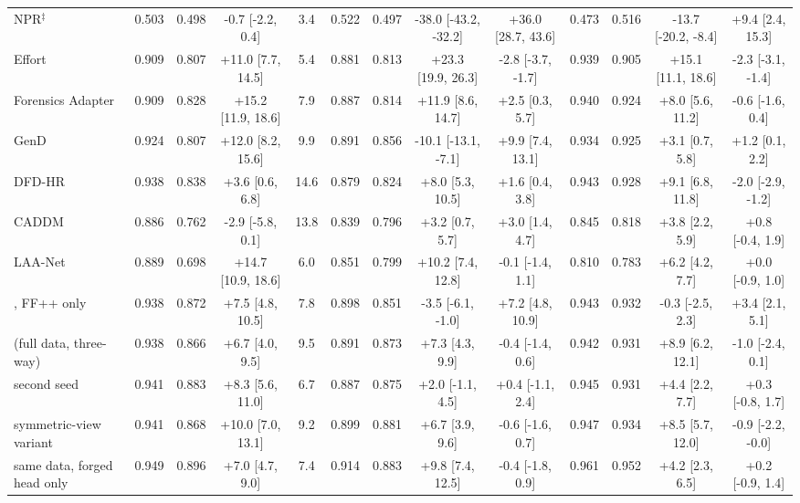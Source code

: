 \begin{tabular}{@{}l cccc cccc cccc@{}}
NPR$^\ddagger$~\cite{npr} & 0.503 & 0.498 & -0.7 [-2.2, 0.4] & 3.4 & 0.522 & 0.497 & -38.0 [-43.2, -32.2] & +36.0 [28.7, 43.6] & 0.473 & 0.516 & -13.7 [-20.2, -8.4] & +9.4 [2.4, 15.3] \\
Effort~\cite{effort} & 0.909 & 0.807 & +11.0 [7.7, 14.5] & 5.4 & 0.881 & 0.813 & +23.3 [19.9, 26.3] & -2.8 [-3.7, -1.7] & 0.939 & 0.905 & +15.1 [11.1, 18.6] & -2.3 [-3.1, -1.4] \\
Forensics Adapter~\cite{forensicsadapter} & 0.909 & 0.828 & +15.2 [11.9, 18.6] & 7.9 & 0.887 & 0.814 & +11.9 [8.6, 14.7] & +2.5 [0.3, 5.7] & 0.940 & 0.924 & +8.0 [5.6, 11.2] & -0.6 [-1.6, 0.4] \\
GenD~\cite{gend2026} & 0.924 & 0.807 & +12.0 [8.2, 15.6] & 9.9 & 0.891 & 0.856 & -10.1 [-13.1, -7.1] & +9.9 [7.4, 13.1] & 0.934 & 0.925 & +3.1 [0.7, 5.8] & +1.2 [0.1, 2.2] \\
DFD-HR~\cite{dfdhr2026} & 0.938 & 0.838 & +3.6 [0.6, 6.8] & 14.6 & 0.879 & 0.824 & +8.0 [5.3, 10.5] & +1.6 [0.4, 3.8] & 0.943 & 0.928 & +9.1 [6.8, 11.8] & -2.0 [-2.9, -1.2] \\
CADDM~\cite{caddm} & 0.886 & 0.762 & -2.9 [-5.8, 0.1] & 13.8 & 0.839 & 0.796 & +3.2 [0.7, 5.7] & +3.0 [1.4, 4.7] & 0.845 & 0.818 & +3.8 [2.2, 5.9] & +0.8 [-0.4, 1.9] \\
LAA-Net~\cite{laanet} & 0.889 & 0.698 & +14.7 [10.9, 18.6] & 6.0 & 0.851 & 0.799 & +10.2 [7.4, 12.8] & -0.1 [-1.4, 1.1] & 0.810 & 0.783 & +6.2 [4.2, 7.7] & +0.0 [-0.9, 1.0] \\
\midrule
\ours{}, FF++ only & 0.938 & 0.872 & +7.5 [4.8, 10.5] & 7.8 & 0.898 & 0.851 & -3.5 [-6.1, -1.0] & +7.2 [4.8, 10.9] & 0.943 & 0.932 & -0.3 [-2.5, 2.3] & +3.4 [2.1, 5.1] \\
\ours{} (full data, three-way) & 0.938 & 0.866 & +6.7 [4.0, 9.5] & 9.5 & 0.891 & 0.873 & +7.3 [4.3, 9.9] & -0.4 [-1.4, 0.6] & 0.942 & 0.931 & +8.9 [6.2, 12.1] & -1.0 [-2.4, 0.1] \\
\quad second seed & 0.941 & 0.883 & +8.3 [5.6, 11.0] & 6.7 & 0.887 & 0.875 & +2.0 [-1.1, 4.5] & +0.4 [-1.1, 2.4] & 0.945 & 0.931 & +4.4 [2.2, 7.7] & +0.3 [-0.8, 1.7] \\
\quad symmetric-view variant & 0.941 & 0.868 & +10.0 [7.0, 13.1] & 9.2 & 0.899 & 0.881 & +6.7 [3.9, 9.6] & -0.6 [-1.6, 0.7] & 0.947 & 0.934 & +8.5 [5.7, 12.0] & -0.9 [-2.2, -0.0] \\
same data, forged head only & 0.949 & 0.896 & +7.0 [4.7, 9.0] & 7.4 & 0.914 & 0.883 & +9.8 [7.4, 12.5] & -0.4 [-1.8, 0.9] & 0.961 & 0.952 & +4.2 [2.3, 6.5] & +0.2 [-0.9, 1.4] \\
\bottomrule
\end{tabular}
